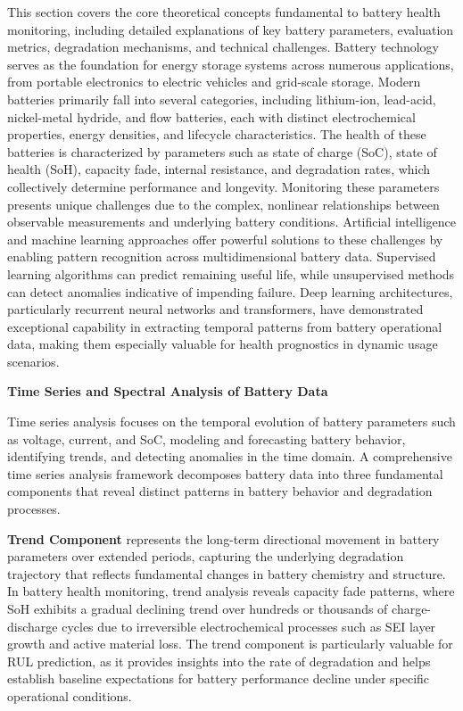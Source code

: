 This section covers the core theoretical concepts fundamental to battery health monitoring, including detailed explanations of key battery parameters, evaluation metrics, degradation mechanisms, and technical challenges. Battery technology serves as the foundation for energy storage systems across numerous applications, from portable electronics to electric vehicles and grid-scale storage. Modern batteries primarily fall into several categories, including lithium-ion, lead-acid, nickel-metal hydride, and flow batteries, each with distinct electrochemical properties, energy densities, and lifecycle characteristics. The health of these batteries is characterized by parameters such as state of charge (SoC), state of health (SoH), capacity fade, internal resistance, and degradation rates, which collectively determine performance and longevity. Monitoring these parameters presents unique challenges due to the complex, nonlinear relationships between observable measurements and underlying battery conditions. Artificial intelligence and machine learning approaches offer powerful solutions to these challenges by enabling pattern recognition across multidimensional battery data. Supervised learning algorithms can predict remaining useful life, while unsupervised methods can detect anomalies indicative of impending failure. Deep learning architectures, particularly recurrent neural networks and transformers, have demonstrated exceptional capability in extracting temporal patterns from battery operational data, making them especially valuable for health prognostics in dynamic usage scenarios.


\textbf{Time Series and Spectral Analysis of Battery Data}

Time series analysis focuses on the temporal evolution of battery parameters such as voltage, current, and SoC, modeling and forecasting battery behavior, identifying trends, and detecting anomalies in the time domain. A comprehensive time series analysis framework decomposes battery data into three fundamental components that reveal distinct patterns in battery behavior and degradation processes.

\textbf{Trend Component} represents the long-term directional movement in battery parameters over extended periods, capturing the underlying degradation trajectory that reflects fundamental changes in battery chemistry and structure. In battery health monitoring, trend analysis reveals capacity fade patterns, where SoH exhibits a gradual declining trend over hundreds or thousands of charge-discharge cycles due to irreversible electrochemical processes such as SEI layer growth and active material loss. The trend component is particularly valuable for RUL prediction, as it provides insights into the rate of degradation and helps establish baseline expectations for battery performance decline under specific operational conditions.

